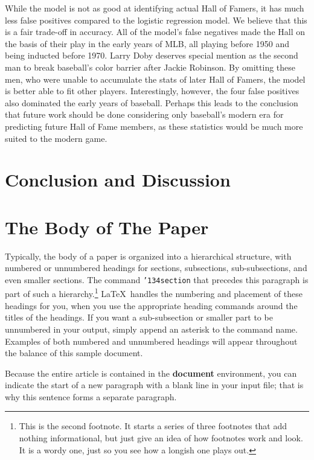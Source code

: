 \documentclass{sigkddExp}
\begin{document}
While the model is not as good at identifying actual Hall of Famers, it has much less false positives compared to the logistic regression model. We believe that this is a fair trade-off in accuracy. All of the model's false negatives made the Hall on the basis of their play in the early years of MLB, all playing before 1950 and being inducted before 1970. Larry Doby deserves special mention as the second man to break baseball's color barrier after Jackie Robinson. By omitting these men, who were unable to accumulate the stats of later Hall of Famers, the model is better able to fit other players. Interestingly, however, the four false positives also dominated the early years of baseball. Perhaps this leads to the conclusion that future work should be done considering only baseball's modern era for predicting future Hall of Fame members, as these statistics would be much more suited to the modern game.

\section{Conclusion and Discussion}

\section{The Body of The Paper}
Typically, the body of a paper is organized
into a hierarchical structure, with numbered or unnumbered
headings for sections, subsections, sub-subsections, and even
smaller sections.  The command \texttt{{\char'134}section} that
precedes this paragraph is part of such a
hierarchy.\footnote{This is the second footnote.  It
starts a series of three footnotes that add nothing
informational, but just give an idea of how footnotes work
and look. It is a wordy one, just so you see
how a longish one plays out.} \LaTeX\ handles the numbering
and placement of these headings for you, when you use
the appropriate heading commands around the titles
of the headings.  If you want a sub-subsection or
smaller part to be unnumbered in your output, simply append an
asterisk to the command name.  Examples of both
numbered and unnumbered headings will appear throughout the
balance of this sample document.

Because the entire article is contained in
the \textbf{document} environment, you can indicate the
start of a new paragraph with a blank line in your
input file; that is why this sentence forms a separate paragraph.
\end{document}
